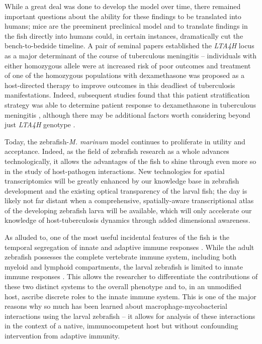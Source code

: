 While a great deal was done to develop the model over time, there remained important questions about the ability for these findings to be translated into humans; mice are the preeminent preclinical model and to translate findings in the fish directly into humans could, in certain instances, dramatically cut the bench-to-bedside timeline. A pair of seminal papers \citep{Tobin2010, Tobin2012} established the \textit{LTA4H} locus as a major determinant of the course of tuberculous meningitis -- individuals with either homozygous allele were at increased risk of poor outcomes and treatment of one of the homozygous populations with dexamethasone was proposed as a host-directed therapy to improve outcomes in this deadliest of tuberculosis manifestations. Indeed, subsequent studies found that this patient stratification strategy was able to determine patient response to dexamethasone in tuberculous meningitis \citep{Thuong2017, Thwaites2013, Wilkinson2017, Davis2018, Prasad2016}, although there may be additional factors worth considering beyond just \textit{LTA4H} genotype \citep{Siddiqi2021}.

Today, the zebrafish-\textit{M. marinum} model continues to proliferate in utility and acceptance. Indeed, as the field of zebrafish research as a whole advances technologically, it allows the advantages of the fish to shine through even more so in the study of host-pathogen interactions. New technologies for spatial transcriptomics will be greatly enhanced by our knowledge base in zebrafish development and the existing optical transparency of the larval fish; the day is likely not far distant when a comprehensive, spatially-aware transcriptional atlas of the developing zebrafish larva will be available, which will only accelerate our knowledge of host-tuberculosis dynamics through added dimensional awareness.

As alluded to, one of the most useful incidental features of the fish is the temporal segregation of innate and adaptive immune responses \citep{Myllymaki2016}. While the adult zebrafish possesses the complete vertebrate immune system, including both myeloid and lymphoid compartments, the larval zebrafish is limited to innate immune responses \citep{Cronan2014}. This allows the researcher to differentiate the contributions of these two distinct systems to the overall phenotype and to, in an unmodified host, ascribe discrete roles to the innate immune system. This is one of the major reasons why so much has been learned about macrophage-mycobacterial interactions using the larval zebrafish -- it allows for analysis of these interactions in the context of a native, immunocompetent host but without confounding intervention from adaptive immunity.

